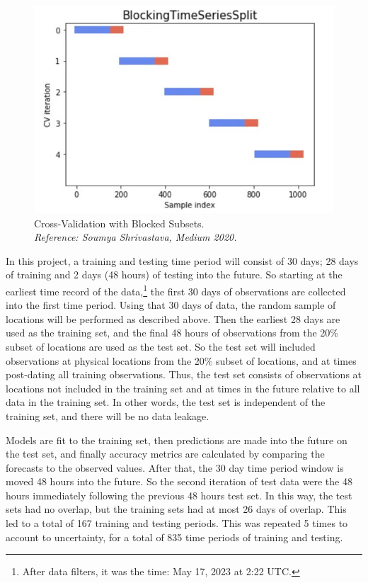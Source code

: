 \documentclass[11pt]{article}%
\begin{document}
\begin{figure}[ht]
    \centering
    \includegraphics[width=1\textwidth]{images/cv.jpg}
    \caption[CV Method]{Cross-Validation with Blocked Subsets.\\ \textit{Reference: Soumya Shrivastava, Medium 2020.}}
    \label{fig:cv}
\end{figure}

In this project, a training and testing time period will consist of 30 days; 28 days of training and 2 days (48 hours) of testing into the future. So starting at the earliest time record of the data,\footnote{After data filters, it was the time: May 17, 2023 at 2:22 UTC.} the first 30 days of observations are collected into the first time period. Using that 30 days of data, the random sample of locations will be performed as described above. Then the earliest 28 days are used as the training set, and the final 48 hours of observations from the 20\% subset of locations are used as the test set. So the test set will included observations at physical locations from the 20\% subset of locations, and at times post-dating all training observations. Thus, the test set consists of observations at locations not included in the training set and at times in the future relative to all data in the training set. In other words, the test set is independent of the training set, and there will be no data leakage. 

Models are fit to the training set, then predictions are made into the future on the test set, and finally accuracy metrics are calculated by comparing the forecasts to the observed values. After that, the 30 day time period window is moved 48 hours into the future. So the second iteration of test data were the 48 hours immediately following the previous 48 hours test set. In this way, the test sets had no overlap, but the training sets had at most 26 days of overlap. This led to a total of 167 training and testing periods. This was repeated 5 times to account to uncertainty, for a total of 835 time periods of training and testing.
\end{document}
